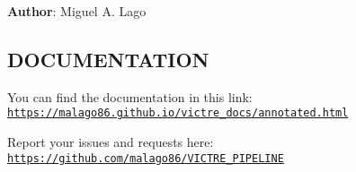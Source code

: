 {\bfseries Author}\-: Miguel A. Lago

\subsection*{D\-O\-C\-U\-M\-E\-N\-T\-A\-T\-I\-O\-N}

You can find the documentation in this link\-: \href{https://malago86.github.io/victre_docs/annotated.html}{\tt https\-://malago86.\-github.\-io/victre\-\_\-docs/annotated.\-html}

Report your issues and requests here\-: \href{https://github.com/malago86/VICTRE_PIPELINE}{\tt https\-://github.\-com/malago86/\-V\-I\-C\-T\-R\-E\-\_\-\-P\-I\-P\-E\-L\-I\-N\-E} 
